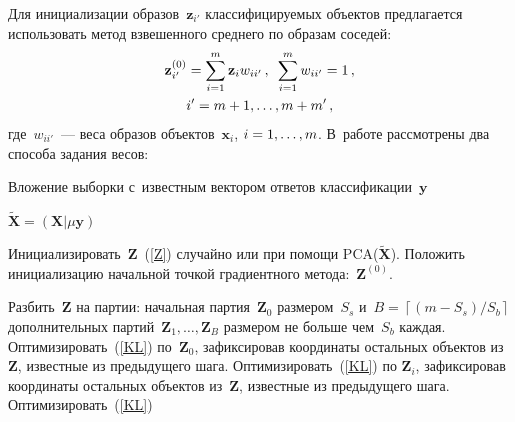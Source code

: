 \begin{multicols}{2}
Для инициализации образов~$\mathbf z_{i'}$ классифицируемых объектов предлагается 
использовать метод взвешенного среднего по образам соседей: 
\begin{multline*}
\mathbf z^{(0)}_{i'}
 = \sum\limits_{i = 1}^m\mathbf z_i w_{ii'}\,,\enskip \sum\limits_{i=1}^mw_{ii'} 
= 1\,,\\
i' = m+1, \ldots, m+m'\,,
\end{multline*}
где~$w_{ii'}$~--- веса образов объектов~$\mathbf x_i$, $i\hm = 1, \ldots, m$.
В~работе рассмотрены два способа задания весов: %


\end{multicols}

 \begin{algorithm*} %
\caption{Вложение выборки с~известным вектором ответов классификации~$\mathbf y$} 
\label{start}
    \SetAlgoLined
    \setcounter{AlgoLine}{0}

    $\tilde{\mathbf X} = (\mathbf X | \mu \mathbf y)$

    Инициализировать~$\mathbf{Z}$~(\ref{Z}) случайно или при помощи PCA($\tilde{\mathbf X}$). Положить инициализацию начальной точкой градиентного метода:~$\mathbf{Z}^{(0)}$.

    {
        Разбить~$\mathbf{Z}$ на партии: начальная партия~$\mathbf{Z}_0$ размером~$S_s$ и~$B = \left \lceil ({m - S_s})/{S_b} \right \rceil$ дополнительных партий~$\mathbf{Z}_1, \dots, \mathbf{Z}_B$ размером не больше чем~$S_b$ каждая.
        Оптимизировать~(\ref{KL}) по~$\mathbf{Z}_0$, зафиксировав координаты остальных объектов из~$\mathbf{Z}$, известные из предыдущего шага.
        {
            Оптимизировать~(\ref{KL}) по $\mathbf{Z}_i$, зафиксировав координаты остальных объектов из~$\mathbf{Z}$, известные из предыдущего шага.
        }
    }
    {
        Оптимизировать~(\ref{KL})
    }
\end{algorithm*}
